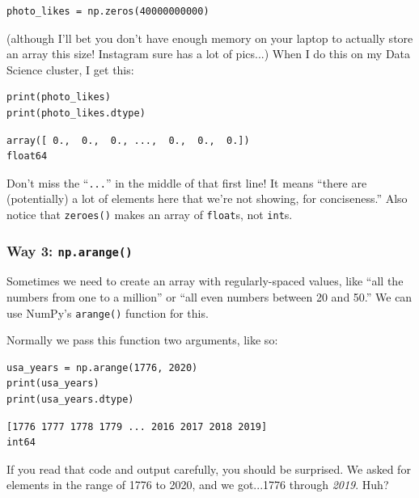 \begin{Verbatim}[fontsize=\small,samepage=true,frame=single,framesep=3mm]
photo_likes = np.zeros(40000000000)
\end{Verbatim}

(although I'll bet you don't have enough memory on your laptop to actually
store an array this size! Instagram sure has a lot of pics...) When I do this
on my Data Science cluster, I get this:

\begin{Verbatim}[fontsize=\small,samepage=true,frame=single,framesep=3mm]
print(photo_likes)
print(photo_likes.dtype)
\end{Verbatim}

\begin{Verbatim}[fontsize=\small,samepage=true,frame=leftline,framesep=5mm,framerule=1mm]
array([ 0.,  0.,  0., ...,  0.,  0.,  0.])
float64
\end{Verbatim}

Don't miss the ``\texttt{...}'' in the middle of that first line! It means
``there are (potentially) a lot of elements here that we're not showing, for
conciseness.'' Also notice that \texttt{zeroes()} makes an array of
\texttt{float}s, not \texttt{int}s.


\subsubsection{Way 3: \texttt{np.arange()}}

Sometimes we need to create an array with regularly-spaced values, like ``all
the numbers from one to a million'' or ``all even numbers between 20 and 50.''
We can use NumPy's \texttt{arange()} function for this.

Normally we pass this function two arguments, like so:

\begin{Verbatim}[fontsize=\small,samepage=true,frame=single,framesep=3mm]
usa_years = np.arange(1776, 2020)
print(usa_years)
print(usa_years.dtype)
\end{Verbatim}

\begin{Verbatim}[fontsize=\small,samepage=true,frame=leftline,framesep=5mm,framerule=1mm]
[1776 1777 1778 1779 ... 2016 2017 2018 2019]
int64
\end{Verbatim}

If you read that code and output carefully, you should be surprised. We asked
for elements in the range of 1776 to 2020, and we got...1776 through
\textit{2019}. Huh?

